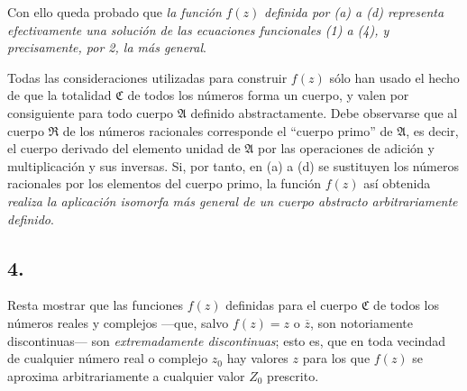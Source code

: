 \documentclass[11pt]{article}
\begin{document}
Con ello queda probado que \emph{la función} $f(z)$ \emph{definida por (a) a (d) representa efectivamente una solución de las ecuaciones funcionales (1) a (4), y precisamente, por 2, la más general}.

Todas las consideraciones utilizadas para construir $f(z)$ sólo han usado el hecho de que la totalidad $\mathfrak C$ de todos los números forma un cuerpo, y valen por consiguiente para todo cuerpo $\mathfrak A$ definido abstractamente. Debe observarse que al cuerpo $\mathfrak R$ de los números racionales corresponde el ``cuerpo primo'' de $\mathfrak A$, es decir, el cuerpo derivado del elemento unidad de $\mathfrak A$ por las operaciones de adición y multiplicación y sus inversas. Si, por tanto, en (a) a (d) se sustituyen los números racionales por los elementos del cuerpo primo, la función $f(z)$ así obtenida \emph{realiza la aplicación isomorfa más general de un cuerpo abstracto arbitrariamente definido}.

\subsection*{4.}

Resta mostrar que las funciones $f(z)$ definidas para el cuerpo $\mathfrak C$ de todos los números reales y complejos ---que, salvo $f(z)=z$ o $\overline z$, son notoriamente discontinuas--- son \emph{extremadamente discontinuas}; esto es, que en toda vecindad de cualquier número real o complejo $z_0$ hay valores $z$ para los que $f(z)$ se aproxima arbitrariamente a cualquier valor $Z_0$ prescrito.
\end{document}
